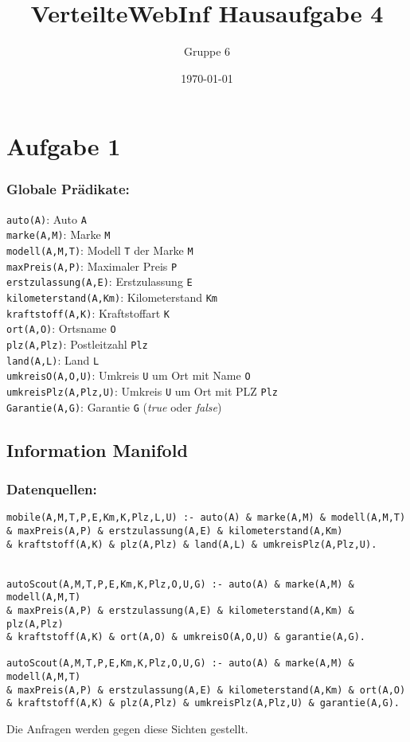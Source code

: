 \documentclass[a4paper]{article}
\author{Gruppe 6}
\title{\textbf{VerteilteWebInf Hausaufgabe 4}}
\date{\today}
\begin{document}
\maketitle


\section*{Aufgabe 1}

\subsubsection*{Globale Prädikate:}
\texttt{auto(A)}: Auto \texttt{A}\\
\texttt{marke(A,M)}: Marke \texttt{M} \\
\texttt{modell(A,M,T)}: Modell \texttt{T} der Marke \texttt{M}\\
\texttt{maxPreis(A,P)}: Maximaler Preis \texttt{P} \\
\texttt{erstzulassung(A,E)}: Erstzulassung \texttt{E} \\
\texttt{kilometerstand(A,Km)}: Kilometerstand \texttt{Km}\\
\texttt{kraftstoff(A,K)}: Kraftstoffart \texttt{K}\\
\texttt{ort(A,O)}: Ortsname \texttt{O}\\
\texttt{plz(A,Plz)}: Postleitzahl \texttt{Plz}\\
\texttt{land(A,L)}: Land \texttt{L}\\
\texttt{umkreisO(A,O,U)}: Umkreis \texttt{U} um Ort mit Name \texttt{O}\\
\texttt{umkreisPlz(A,Plz,U)}: Umkreis \texttt{U} um Ort mit PLZ \texttt{Plz} \\
\texttt{Garantie(A,G)}: Garantie \texttt{G} (\emph{true} oder \emph{false})\\


\subsection*{Information Manifold}


\subsubsection*{Datenquellen:}
\begin{verbatim}
mobile(A,M,T,P,E,Km,K,Plz,L,U) :- auto(A) & marke(A,M) & modell(A,M,T) 
& maxPreis(A,P) & erstzulassung(A,E) & kilometerstand(A,Km) 
& kraftstoff(A,K) & plz(A,Plz) & land(A,L) & umkreisPlz(A,Plz,U).


autoScout(A,M,T,P,E,Km,K,Plz,O,U,G) :- auto(A) & marke(A,M) & modell(A,M,T) 
& maxPreis(A,P) & erstzulassung(A,E) & kilometerstand(A,Km) & plz(A,Plz)
& kraftstoff(A,K) & ort(A,O) & umkreisO(A,O,U) & garantie(A,G).

autoScout(A,M,T,P,E,Km,K,Plz,O,U,G) :- auto(A) & marke(A,M) & modell(A,M,T) 
& maxPreis(A,P) & erstzulassung(A,E) & kilometerstand(A,Km) & ort(A,O)
& kraftstoff(A,K) & plz(A,Plz) & umkreisPlz(A,Plz,U) & garantie(A,G).
\end{verbatim}
Die Anfragen werden gegen diese Sichten gestellt.
\end{document}
